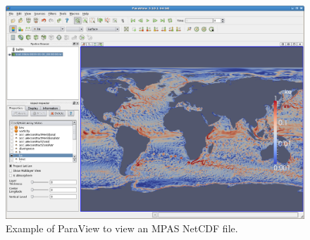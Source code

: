 \begin{figure}[htb]
\begin{center}
\includegraphics[width=6.5in]{shared/figures/ParaviewExample.png}
\caption{Example of ParaView to view an MPAS NetCDF file.}
\label{fig:ParaviewExample}
\end{center}
\end{figure}
